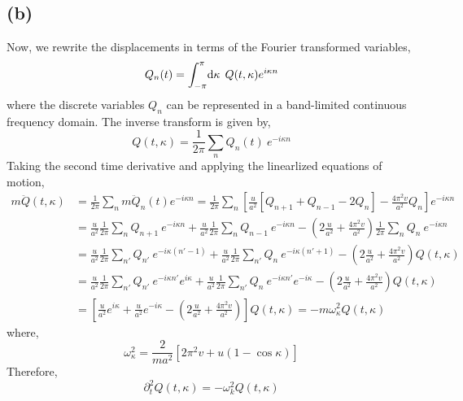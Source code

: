 \documentclass[12pt]{extarticle}
\begin{document}
\subsection*{(b)}
Now, we rewrite the displacements in terms of the Fourier transformed variables,
\[Q_n(t) = \int_{-\pi}^{\pi} \! \mathrm{d}\kappa \: \: Q(t, \kappa) e^{i \kappa n} \] 
where the discrete variables $Q_n$ can be represented in a band-limited continuous frequency domain. The inverse transform is given by,
\[Q(t, \kappa) = \frac{1}{2\pi} \sum_{n} Q_n(t) \: e^{- i \kappa n}\]
Taking the second time derivative and applying the linearlized equations of motion,
\begin{align*} m \ddot{Q}(t, \kappa) & = \frac{1}{2\pi} \sum_{n} m \ddot{Q}_n(t) e^{- i \kappa n} = \frac{1}{2\pi} \sum_{n} \left[\frac{u}{a^2} \left[ Q_{n + 1} + Q_{n - 1} - 2 Q_n \right] - \frac{4 \pi^2 v}{a^2} Q_n \right] e^{ -i \kappa n}  
\\
& =  \frac{u}{a^2} \frac{1}{2\pi} \sum_{n} Q_{n + 1} \: e^{ -i \kappa n} + \frac{u}{a^2} \frac{1}{2\pi} \sum_{n} Q_{n - 1} \: e^{ -i \kappa n} - \left(2 \frac{u}{a^2} + \frac{4 \pi^2 v}{a^2} \right) \frac{1}{2\pi} \sum_{n} Q_{n} \: e^{ -i \kappa n} 
\\ 
& = \frac{u}{a^2} \frac{1}{2\pi} \sum_{n'} Q_{n'} \: e^{ -i \kappa (n' - 1)} + \frac{u}{a^2} \frac{1}{2\pi} \sum_{n'} Q_{n} \: e^{ -i \kappa (n' + 1)} - \left(2 \frac{u}{a^2} + \frac{4 \pi^2 v}{a^2} \right)  Q(t, \kappa) 
\\
& = \frac{u}{a^2} \frac{1}{2\pi} \sum_{n'} Q_{n'} \: e^{ -i \kappa n'} e^{i \kappa} + \frac{u}{a^2} \frac{1}{2\pi} \sum_{n'} Q_{n} \: e^{ -i \kappa n'} e^{-i \kappa} - \left(2 \frac{u}{a^2} + \frac{4 \pi^2 v}{a^2} \right) Q(t, \kappa) 
\\
& = \left[ \frac{u}{a^2}  e^{i \kappa} + \frac{u}{a^2} e^{-i \kappa} - \left(2 \frac{u}{a^2} + \frac{4 \pi^2 v}{a^2} \right) \right] Q(t, \kappa) = - m \omega_{\kappa}^2 Q(t, \kappa)
\end{align*}
where, 
\[\omega_\kappa^2 = \frac{2}{m a^2} \left[ 2\pi^2 v + u \left(1 - \cos{\kappa}\right) \right]\]
Therefore,
\[ \partial_t^2 Q(t,\kappa) = - \omega^2_k Q(t, \kappa)\]
\end{document}
